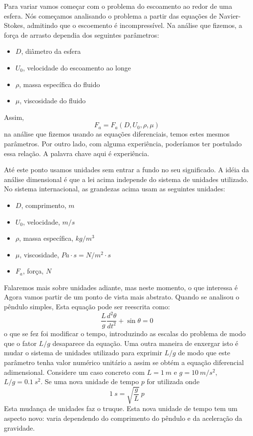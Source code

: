 Para variar vamos começar com o problema do escoamento ao redor de uma esfera. Nós começamos analisando o problema a partir das equações de Navier-Stokes, admitindo que o escoemento é incompressível. Na análise que fizemos, a força de arrasto dependia dos seguintes parâmetros:
\begin{itemize}
\item $D$, diâmetro da esfera
\item $U_0$, velocidade do escoamento ao longe
\item $\rho$, massa específica do fluido
\item $\mu$, viscosidade do fluido
\end{itemize}

Assim,
\[
F_a = F_a(D, U_0, \rho, \mu)
\]
na análise que fizemos usando as equações diferenciais, temos estes mesmos parâmetros. Por outro lado, com alguma experiência, poderíamos ter postulado essa relação. A palavra chave aqui é experiência.

Até este ponto usamos unidades sem entrar a fundo no seu significado. A idéia da análise dimensional é que a lei acima independe do sistema de unidades utilizado. No sistema internacional, as grandezas acima usam as seguintes unidades:

\begin{itemize}
\item $D$, comprimento, $m$
\item $U_0$, velocidade, $m/s$
\item $\rho$, massa específica, $kg/m^3$
\item $\mu$, viscosidade, $Pa\cdot s = N/m^2 \cdot s$
\item $F_a$, força, $N$
\end{itemize}

Falaremos mais sobre unidades adiante, mas neste momento, o que interessa é
 Agora vamos partir de um ponto de vista mais abstrato.
Quando se analisou o pêndulo simples, 
Esta equação pode ser reescrita como:
\[
\frac{L}{g}\frac{d^2\theta}{dt^2} + \sin\theta = 0 
\]
o que se fez foi modificar o tempo, introduzindo as escalas do problema de modo que o fator $L/g$ desaparece da equação. Uma outra maneira de enxergar isto é mudar o sistema de unidades utilizado para exprimir $L/g$ de modo que este parâmetro tenha valor numérico unitário a assim se obtém a equação diferencial adimensional. Considere um caso concreto com $L = 1\:m$ e $g = 10\: m/s^2$, $L/g=0.1\:s^2$. Se uma nova unidade de tempo $p$ for utilizada onde 
\[
1\:s = \sqrt{\frac{g}{L}}\:p
\] 
Esta mudança de unidades faz o truque. Esta nova unidade de tempo tem um aspecto novo: varia dependendo do comprimento do pêndulo e da aceleração da gravidade.

